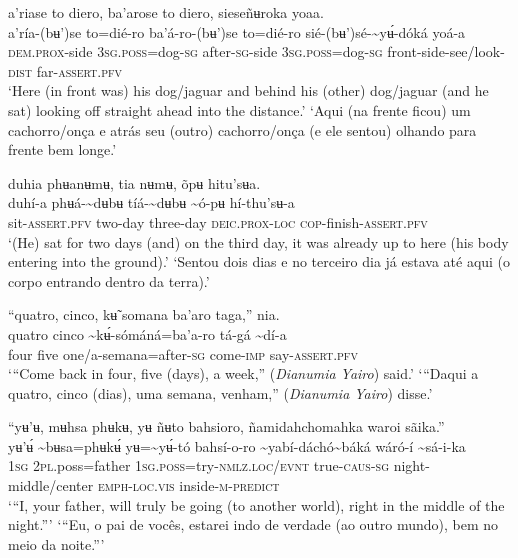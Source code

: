 \documentclass[output=paper,
modfonts,nonflat
]{langsci/langscibook}
\begin{document}
\ea a’riase to diero, ba'arose to diero, sieseñʉroka yoaa. \\[.3em]
\gll a’ría-(bʉ')se	to=dié-ro	ba'á-ro-(bʉ')se	to=dié-ro	sié-(bʉ')sé-{\textasciitilde}yʉ́-dóká	yoá-a \\
     \textsc{dem.prox}-side	3\textsc{sg.poss}=dog\textsc{-sg}	after\textsc{-sg}-side	3\textsc{sg.poss}=dog\textsc{-sg}	front-side-see/look-\textsc{dist}	far-\textsc{assert.pfv}\\
\glt ‘Here (in front was) his dog/jaguar and behind his (other) dog/jaguar (and he sat) looking off straight ahead into the distance.’
\glt ‘Aqui (na frente ficou) um cachorro/onça e atrás seu (outro) cachorro/onça (e ele sentou) olhando para frente bem longe.’
\z 

\ea duhia phʉanʉmʉ, tia nʉmʉ, õpʉ hitu'sʉa.  \\[.3em]
\gll duhí-a	phʉá-{\textasciitilde}dʉbʉ	tíá-{\textasciitilde}dʉbʉ	{\textasciitilde}ó-pʉ	hí-thu'sʉ-a \\
     sit-\textsc{assert.pfv}	two-day	three-day	\textsc{deic.prox-loc}	\textsc{cop-}finish-\textsc{assert.pfv}\\
\glt ‘(He) sat for two days (and) on the third day, it was already up to here (his body entering into the ground).’
\glt ‘Sentou dois dias e no terceiro dia já estava até aqui (o corpo entrando dentro da terra).’
\z 


\largerpage
\ea “quatro, cinco, kʉ̃ somana ba'aro taga,” nia. \\[.3em]
\gll quatro	cinco {\textasciitilde}kʉ́-sómáná=ba'a-ro	tá-gá	{\textasciitilde}dí-a \\
     four	five	one/a-semana=after\textsc{-sg}	come-\textsc{imp}	say-\textsc{assert.pfv}\\
\glt ‘“Come back in four, five (days), a week,” (\textit{Dianumia Yairo}) said.’ 
\glt ‘“Daqui a quatro, cinco (dias), uma semana, venham,” (\textit{Dianumia Yairo}) disse.’
\z 
 

\ea “yʉ’ʉ, mʉhsa phʉkʉ, yʉ ñʉto bahsioro, ñamidahchomahka waroi sãika.” \\[.3em]
\gll yʉ’ʉ́	{\textasciitilde}bʉsa=phʉkʉ́	yʉ={\textasciitilde}yʉ́-tó	bahsí-o-ro {\textasciitilde}yabí-dáchó{\textasciitilde}báká	wáró-í	{\textasciitilde}sá-i-ka\\
     1\textsc{sg}	2\textsc{pl}.poss=father	1\textsc{sg.poss}=try-\textsc{nmlz.loc/evnt}	true\textsc{-caus-sg} night-middle/center	\textsc{emph}\textsc{-loc.vis}	inside-\textsc{m-predict}\\
\glt ‘“I, your father, will truly be going (to another world), right in the middle of the night.”’
\glt ‘“Eu, o pai de vocês, estarei indo de verdade (ao outro mundo), bem no meio da noite.”’
\z 
\end{document}
